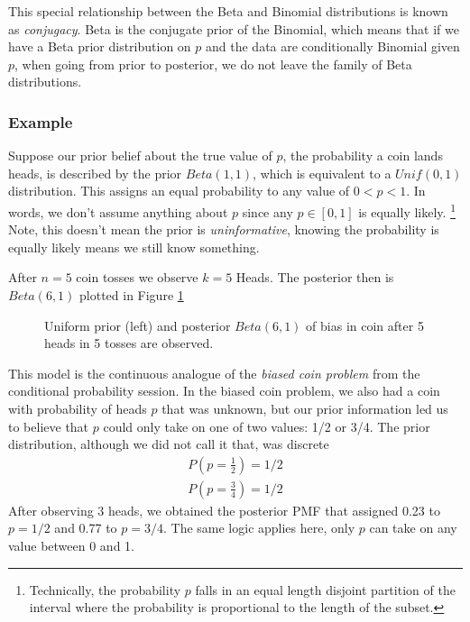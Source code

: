 \documentclass[11pt,a4paper]{article}
\begin{document}
This special relationship between the Beta and Binomial distributions is known as \emph{conjugacy}. 
Beta is the conjugate prior of the Binomial, 
which means that if we have a Beta prior distribution on \(p\) 
and the data are conditionally Binomial given \(p\), 
when going from prior to posterior, 
we do not leave the family of Beta distributions.

\subsubsection{Example}

Suppose our prior belief about the true value of \(p\), 
the probability a coin lands heads, 
is described by the prior \(Beta(1,1)\), 
which is equivalent to a \(Unif(0,1)\) distribution. 
This assigns an equal probability to any value of \(0<p<1.\) 
In words, 
we don't assume anything about \(p\) since any \(p \in [0,1]\) is 
equally likely.%
\footnote{Technically, 
the probability \(p\) falls in an equal length disjoint partition of the interval where 
the probability is proportional to the length of the subset.}
Note, 
this doesn't mean the prior is \emph{uninformative}, 
knowing the probability is equally likely means we still know something.

After \(n = 5\) coin tosses we observe \(k = 5\) Heads. 
The posterior then is \(Beta(6,1)\) plotted in Figure \ref{fig:prior}

\begin{figure}[h!]
\centering
\begin{minipage}{.5\textwidth}
  \centering
  
\end{minipage}%
\begin{minipage}{.5\textwidth}
  \centering
  
\end{minipage}
\caption{%
Uniform prior (left) and posterior \(Beta(6,1)\) of bias in 
coin after 5 heads in 5 tosses are observed.}
\label{fig:prior}
\end{figure}

This model is the continuous analogue of the 
\emph{biased coin problem} from the conditional probability session. 
In the biased coin problem, 
we also had a coin with probability of heads \(p\) that was unknown, 
but our prior information led us to believe that \(p\) could only take on one of two values: 1/2 or 3/4. 
The prior distribution, 
although we did not call it that, 
was discrete
\begin{align}P\left( p = \frac{1}{2} \right) = 1/2\end{align}
\begin{align}P\left( p = \frac{3}{4} \right) = 1/2\end{align}
After observing 3 heads, 
we obtained the posterior PMF that assigned 0.23 to \(p = 1/2\) and 0.77 to \(p = 3/4\). 
The same logic applies here, 
only \(p\) can take on any value between 0 and 1.
\end{document}
